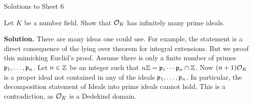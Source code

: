 \documentclass[a4paper,11pt]{article}
\begin{document}
\begin{center}
    \huge{Solutions to Sheet 6}
\end{center}

Let $K$ be a number field. Show that $\mathcal{O}_K$ has infinitely many
prime ideals.

\textbf{Solution.}
There are many ideas one could use. For example, the statement is a direct 
consequence of the lying over theorem for integral extensions. But we proof this
mimicking Euclid's proof. Assume there is only a finite number of primes
$\mathfrak{p}_1, \dots, \mathfrak{p}_n$. Let $n \in \mathbb{Z}$ be an integer such that 
$n\mathbb{Z} = \mathfrak{p}_1 \cdots \mathfrak{p}_n \cap \mathbb{Z}$. Now $(n+1)\mathcal{O}_K$ is a proper ideal not contained
in any of the ideals $\mathfrak{p}_1, \dots, \mathfrak{p}_n$. In particular, 
the decomposition statement of Ideals into prime ideals
cannot hold. This is a contradiction, as $\mathcal{O}_K$ is a Dedekind domain.
\end{document}
